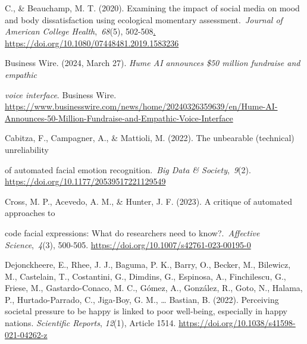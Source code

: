 \documentclass[authordate, empirical]{jote-new-article}
\begin{document}
	C., \& Beauchamp, M. T. (2020). Examining the impact of social media on mood and body dissatisfaction using ecological momentary assessment. \emph{Journal of American College Health}, \emph{68}(5), 502-508\href{file:////Users/annemargit/Library/CloudStorage/GoogleDrive-annemargitreitsema@gmail.com/My%20Drive/!%20UU/Reflectie%20artikel/.%20https:/doi.org/10.1080/07448481.2019.1583236}{. https://doi.org/10.1080/07448481.2019.1583236}



	Business Wire. (2024, March 27). \emph{Hume AI announces \$50 million fundraise and empathic }



	\emph{voice interface}. Business Wire. \href{https://www.businesswire.com/news/home/20240326359639/en/Hume-AI-Announces-50-Million-Fundraise-and-Empathic-Voice-Interface}{https://www.businesswire.com/news/home/20240326359639/en/Hume-AI-Announces-50-Million-Fundraise-and-Empathic-Voice-Interface}



	Cabitza, F., Campagner, A., \& Mattioli, M. (2022). The unbearable (technical) unreliability



	of automated facial emotion recognition. \emph{Big Data \& Society}, \emph{9}(2). \href{https://doi.org/10.1177/20539517221129549}{https://doi.org/10.1177/20539517221129549}



	Cross, M. P., Acevedo, A. M., \& Hunter, J. F. (2023). A critique of automated approaches to



	code facial expressions: What do researchers need to know?. \emph{Affective Science}, \emph{4}(3), 500-505. \href{https://doi.org/10.1007/s42761-023-00195-0}{https://doi.org/10.1007/s42761-023-00195-0}



	Dejonckheere, E., Rhee, J. J., Baguma, P. K., Barry, O., Becker, M., Bilewicz, M., Castelain, T., Costantini, G., Dimdins, G., Espinosa, A., Finchilescu, G., Friese, M., Gastardo-Conaco, M. C., Gómez, A., González, R., Goto, N., Halama, P., Hurtado-Parrado, C., Jiga-Boy, G. M., … Bastian, B. (2022). Perceiving societal pressure to be happy is linked to poor well-being, especially in happy nations. \emph{Scientific Reports}, \emph{12}(1), Article 1514. \href{https://doi.org/10.1038/s41598-021-04262-z}{https://doi.org/10.1038/s41598-021-04262-z}
\end{document}
